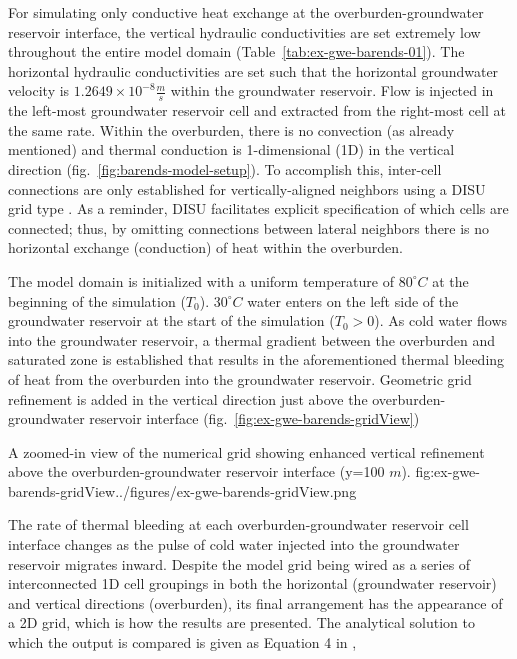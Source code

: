 For simulating only conductive heat exchange at the overburden-groundwater reservoir interface, the vertical hydraulic conductivities are set extremely low throughout the entire model domain (Table~\ref{tab:ex-gwe-barends-01}).  The horizontal hydraulic conductivities are set such that the horizontal groundwater velocity is $1.2649 \times 10^{-8} \frac {m}{s}$ within the groundwater reservoir.  Flow is injected in the left-most groundwater reservoir cell and extracted from the right-most cell at the same rate.  Within the overburden, there is no convection (as already mentioned) and thermal conduction is 1-dimensional (1D) in the vertical direction (fig.~\ref{fig:barends-model-setup}).  To accomplish this, inter-cell connections are only established for vertically-aligned neighbors using a DISU grid type \citep{modflow6gwf}.  As a reminder, DISU facilitates explicit specification of which cells are connected; thus, by omitting connections between lateral neighbors there is no horizontal exchange (conduction) of heat within the overburden.  

%

The model domain is initialized with a uniform temperature of $80^{\circ}C$ at the beginning of the simulation ($T_0$).  $30^{\circ}C$ water enters on the left side of the groundwater reservoir at the start of the simulation ($T_0 > 0$).  As cold water flows into the groundwater reservoir, a thermal gradient between the overburden and saturated zone is established that results in the aforementioned thermal bleeding of heat from the overburden into the groundwater reservoir.  Geometric grid refinement is added in the vertical direction just above the overburden-groundwater reservoir interface (fig.~\ref{fig:ex-gwe-barends-gridView})

\begin{StandardFigure}{
    A zoomed-in view of the numerical grid showing enhanced vertical refinement above the overburden-groundwater reservoir interface (y=100 $m$).}
    {fig:ex-gwe-barends-gridView}{../figures/ex-gwe-barends-gridView.png}
\end{StandardFigure}

The rate of thermal bleeding at each overburden-groundwater reservoir cell interface changes as the pulse of cold water injected into the groundwater reservoir migrates inward.  Despite the model grid being wired as a series of interconnected 1D cell groupings in both the horizontal (groundwater reservoir) and vertical directions (overburden), its final arrangement has the appearance of a 2D grid, which is how the results are presented.  The analytical solution to which the \mf output is compared is given as Equation 4 in \cite{barends2010},

